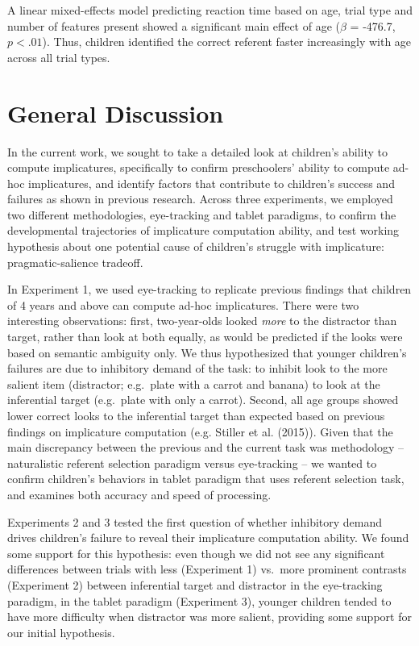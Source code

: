 \documentclass[a4paper,man,apacite,floatsintext]{apa6}
\begin{document}
A linear mixed-effects model predicting reaction time based on age,
trial type and number of features present showed a significant main
effect of age (\(\beta\) = -476.7, \(p < .01\)). Thus, children
identified the correct referent faster increasingly with age across all
trial types.

\section{General Discussion}\label{general-discussion}

In the current work, we sought to take a detailed look at children's
ability to compute implicatures, specifically to confirm preschoolers'
ability to compute ad-hoc implicatures, and identify factors that
contribute to children's success and failures as shown in previous
research. Across three experiments, we employed two different
methodologies, eye-tracking and tablet paradigms, to confirm the
developmental trajectories of implicature computation ability, and test
working hypothesis about one potential cause of children's struggle with
implicature: pragmatic-salience tradeoff.

In Experiment 1, we used eye-tracking to replicate previous findings
that children of 4 years and above can compute ad-hoc implicatures.
There were two interesting observations: first, two-year-olds looked
\emph{more} to the distractor than target, rather than look at both
equally, as would be predicted if the looks were based on semantic
ambiguity only. We thus hypothesized that younger children's failures
are due to inhibitory demand of the task: to inhibit look to the more
salient item (distractor; e.g.~plate with a carrot and banana) to look
at the inferential target (e.g.~plate with only a carrot). Second, all
age groups showed lower correct looks to the inferential target than
expected based on previous findings on implicature computation (e.g.
Stiller et al. (2015)). Given that the main discrepancy between the
previous and the current task was methodology -- naturalistic referent
selection paradigm versus eye-tracking -- we wanted to confirm
children's behaviors in tablet paradigm that uses referent selection
task, and examines both accuracy and speed of processing.

Experiments 2 and 3 tested the first question of whether inhibitory
demand drives children's failure to reveal their implicature computation
ability. We found some support for this hypothesis: even though we did
not see any significant differences between trials with less (Experiment
1) vs.~more prominent contrasts (Experiment 2) between inferential
target and distractor in the eye-tracking paradigm, in the tablet
paradigm (Experiment 3), younger children tended to have more difficulty
when distractor was more salient, providing some support for our initial
hypothesis.
\end{document}
